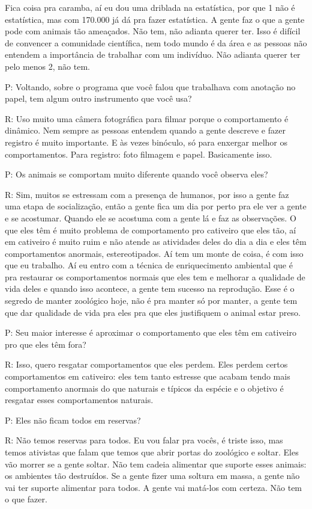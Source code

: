 Fica coisa pra caramba, aí eu dou uma driblada na estatística, por que 1 não é estatística, mas com 170.000 já dá pra fazer estatística. A gente faz o que a gente pode com animais tão ameaçados. Não tem, não adianta querer ter. Isso é difícil de convencer a comunidade científica, nem todo mundo é da área e as pessoas não entendem a importância de trabalhar com um indivíduo. Não adianta querer ter pelo menos 2, não tem.


P: Voltando, sobre o programa que você falou que trabalhava com anotação no papel, tem algum outro instrumento que você usa?

R: Uso muito uma câmera fotográfica para filmar porque o comportamento é dinâmico. Nem sempre as pessoas entendem quando a gente descreve e fazer registro é muito importante. E às vezes binóculo, só para enxergar melhor os comportamentos. Para registro: foto filmagem e papel. Basicamente isso.


P: Os animais se comportam muito diferente quando você observa eles?

R: Sim, muitos se estressam com a presença de humanos, por isso a gente faz uma etapa de socialização, então a gente fica um dia por perto pra ele ver a gente e se acostumar. Quando ele se acostuma com a gente lá e faz as observações. O que eles têm é muito problema de comportamento pro cativeiro que eles tão, aí em cativeiro é muito ruim e não atende as atividades deles do dia a dia e eles têm comportamentos anormais, estereotipados. Aí tem um monte de coisa, é com isso que eu trabalho. Aí eu entro com a técnica de enriquecimento ambiental que é pra restaurar os comportamentos normais que eles tem e melhorar a qualidade de vida deles e quando isso acontece, a gente tem sucesso na reprodução. Esse é o segredo de manter zoológico hoje, não é pra manter só por manter, a gente tem que dar qualidade de vida pra eles pra que eles justifiquem o animal estar preso.


P: Seu maior interesse é aproximar o comportamento que eles têm em cativeiro pro que eles têm fora?

R: Isso, quero resgatar comportamentos que eles perdem. Eles perdem certos comportamentos em cativeiro: eles tem tanto estresse que acabam tendo mais comportamento anormais do que naturais e típicos da espécie e o objetivo é resgatar esses comportamentos naturais.


P: Eles não ficam todos em reservas?

R: Não temos reservas para todos. Eu vou falar pra vocês, é triste isso, mas temos ativistas que falam que temos que abrir portas do zoológico e soltar. Eles vão morrer se a gente soltar. Não tem cadeia alimentar que suporte esses animais: os ambientes tão destruídos. Se a gente fizer uma soltura em massa, a gente não vai ter suporte alimentar para todos. A gente vai matá-los com certeza. Não tem o que fazer.  

